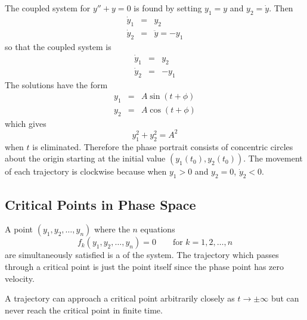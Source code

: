 \begin{example}
The coupled system for $y''+y=0$ is found by setting
$y_1=y$ and $y_2=\dot{y}$.  Then 
\begin{eqnarray*}
\dot{y}_1&=&y_2\\
\dot{y}_2&=&\ddot{y}=-y_1
\end{eqnarray*}
so that the coupled system is
\begin{eqnarray*}
\dot{y}_1&=&y_2\\
\dot{y}_2&=&-y_1
\end{eqnarray*}
The solutions have the form
\begin{eqnarray*}
y_1&=&A\sin(t+\phi)\\
y_2&=&A\cos(t+\phi)
\end{eqnarray*}
which gives
$$y_1^2+y_2^2=A^2$$
when $t$ is eliminated.  Therefore the phase portrait consists of  
concentric circles about the origin starting at the initial value $(y_1(t_0),
y_2(t_0))$.  The movement of each trajectory is clockwise because when
$y_1>0$ and $y_2=0$, $\dot{y}_2<0$.
\begin{center}
\end{center}
\end{example}

\subsection{Critical Points in Phase Space}

A point $(y_1, y_2, \ldots, y_n)$ where the $n$ equations
$$f_k(y_1, y_2, \ldots, y_n)=0\qquad\mbox{for $k=1,2,\ldots,n$}$$
are simultaneously satisfied is a  of the system.  The
trajectory which passes through a critical point is just the point itself
since the phase point has zero velocity.

A trajectory can approach a critical point arbitrarily closely as
$t\to\pm\infty$ but can never reach the critical point in finite time.

